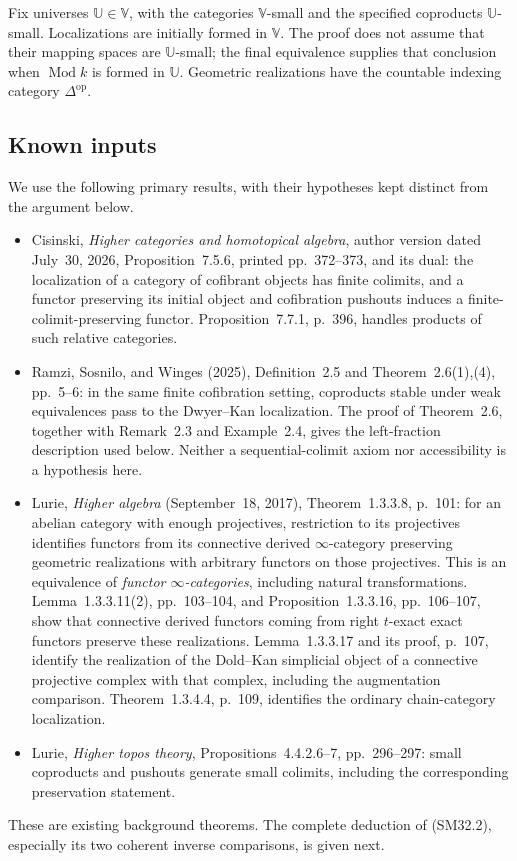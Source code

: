 Fix universes \(\mathbb U\in\mathbb V\), with the categories
\(\mathbb V\)-small and the specified coproducts
\(\mathbb U\)-small.  Localizations are initially formed in
\(\mathbb V\).  The proof does not assume that their mapping
spaces are \(\mathbb U\)-small; the final equivalence supplies
that conclusion when \(\operatorname{Mod}k\) is formed in
\(\mathbb U\).  Geometric realizations have the countable
indexing category \(\Delta^{\mathrm{op}}\).

\subsection{Known inputs}
We use the following primary results, with their hypotheses
kept distinct from the argument below.
\begin{itemize}
\item Cisinski, \emph{Higher categories and homotopical algebra},
author version dated July~30, 2026, Proposition~7.5.6,
printed pp.~372--373, and its dual: the localization of a
category of cofibrant objects has finite colimits, and a
functor preserving its initial object and cofibration pushouts
induces a finite-colimit-preserving functor.  Proposition~7.7.1,
p.~396, handles products of such relative categories.
\item Ramzi, Sosnilo, and Winges (2025), Definition~2.5 and
Theorem~2.6(1),(4), pp.~5--6: in the same finite cofibration
setting, coproducts stable under weak equivalences pass to the
Dwyer--Kan localization.  The proof of Theorem~2.6, together
with Remark~2.3 and Example~2.4, gives the left-fraction
description used below.  Neither a sequential-colimit axiom
nor accessibility is a hypothesis here.
\item Lurie, \emph{Higher algebra} (September~18, 2017),
Theorem~1.3.3.8, p.~101: for an abelian category with enough
projectives, restriction to its projectives identifies functors
from its connective derived \(\infty\)-category preserving
geometric realizations with arbitrary functors on those
projectives.  This is an equivalence of \emph{functor
\(\infty\)-categories}, including natural transformations.
Lemma~1.3.3.11(2), pp.~103--104, and Proposition~1.3.3.16,
pp.~106--107, show that connective derived functors coming
from right \(t\)-exact exact functors preserve these
realizations.  Lemma~1.3.3.17 and its proof, p.~107, identify
the realization of the Dold--Kan simplicial object of a
connective projective complex with that complex, including
the augmentation comparison.  Theorem~1.3.4.4, p.~109,
identifies the ordinary chain-category localization.
\item Lurie, \emph{Higher topos theory},
Propositions~4.4.2.6--7, pp.~296--297: small coproducts and
pushouts generate small colimits, including the corresponding
preservation statement.
\end{itemize}
These are existing background theorems.  The complete deduction
of (SM32.2), especially its two coherent inverse comparisons,
is given next.

